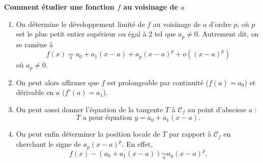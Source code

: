 \begin{Meth}
\textbf{Comment étudier une fonction $f$ au voisinage de $a$}\\

\begin{enumerate}
\item On détermine le développement limité de $f$ au voisinage de $a$ d’ordre $p$, où $p$ est le plus petit entier supérieur ou égal à 2 tel que $a_p \neq 0$. Autrement dit, on se ramène à
$$f(x) \underset{a}{=} a_0 + a_1(x - a) + a_p (x - a)^p + o((x - a)^p)$$
où $a_p \neq 0$.

\item On peut alors affirmer que $f$ est prolongeable par continuité ($f(a) = a_0$) et dérivable en $a$ ($f'(a) = a_1$).

\item On peut aussi donner l’équation de la tangente $T$ à $\mathcal{C}_f$ au point d’abscisse $a$ :
$$T \text{ a pour équation } y = a_0 + a_1(x - a).$$

\item On peut enfin déterminer la position locale de $T$ par rapport à $\mathcal{C}_f$ en cherchant le signe de $a_p (x - a)^p$. En effet,
\[f(x) - (a_0 + a_1(x - a)) \underset{a}{\sim} a_p (x - a)^p.\]
\end{enumerate}
\end{Meth}
%



